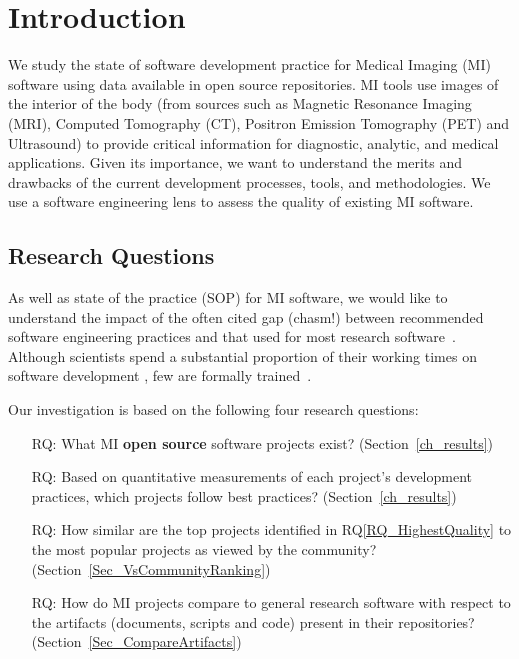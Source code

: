 \documentclass[final, 12pt, 3p, times]{elsarticle}
\newcounter{rqnum} %
\newcommand{\rqref}[1]{RQ\ref{#1}}
\newcounter{qnum} %
\begin{document}

\section{Introduction} \label{ch_intro}

We study the state of software development practice for Medical Imaging
(MI) software using data available in open source repositories.  MI tools use
images of the interior of the body (from sources such as Magnetic Resonance
Imaging (MRI), Computed Tomography (CT), Positron Emission Tomography (PET) and
Ultrasound) to provide critical information for diagnostic, analytic, and medical
applications. Given its importance, we want to understand the merits and
drawbacks of the current development processes, tools, and methodologies. We
use a software engineering lens to assess the quality of existing MI software.

\subsection{Research Questions} \label{sec_motivation}

As well as state of the practice (SOP) for MI software, we would like to
understand the impact of the often cited gap (chasm!) between recommended
software engineering practices and that used for most research 
software~\cite{Storer2017}. Although scientists spend
a substantial proportion of their working times on software development
\cite{Hannay2009, Prabhu2011}, few are formally trained~\cite{Hannay2009}.

Our investigation is based on the following four research questions:
\begin{enumerate}
\item[RQ\refstepcounter{rqnum}\therqnum \label{RQ_WhatProjects}:] What MI
\textbf{open source} software projects exist? (Section~\ref{ch_results})
\item [RQ\refstepcounter{rqnum}\therqnum \label{RQ_HighestQuality}:] Based on
quantitative measurements of each project's development practices, which
projects follow best practices? (Section~\ref{ch_results})
\item [RQ\refstepcounter{rqnum}\therqnum \label{RQ_CompareHQ2Popular}:] How
similar are the top projects identified in \rqref{RQ_HighestQuality}
to the most popular projects as viewed by the community?
(Section~\ref{Sec_VsCommunityRanking})
\item [RQ\refstepcounter{rqnum}\therqnum \label{RQ_CompareArtifacts}:] How
do MI projects compare to general research software with respect to the
artifacts (documents, scripts and code) present in their repositories?
(Section~\ref{Sec_CompareArtifacts})
\end{enumerate}
\end{document}
